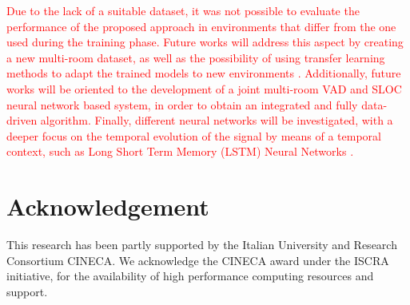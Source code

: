\documentclass[review]{elsarticle}
\begin{document}
\textcolor{red}{
Due to the lack of a suitable dataset, it was not possible to evaluate the performance of the proposed approach in environments that differ from the one used during the training phase. Future works will address this aspect by creating a new multi-room dataset, as well as the possibility of using transfer learning methods to adapt the trained models to new environments \cite{Pan2010}. Additionally, future works will be oriented to the development of a joint multi-room VAD \cite{ijcnn-vad,ijcnn2016-vad} and SLOC neural network based system, in order to obtain an integrated and fully data-driven algorithm. Finally, different neural networks will be investigated, with a deeper focus on the temporal evolution of the signal by means of a temporal context, such as Long Short Term Memory (LSTM) Neural Networks \cite{hochreiter1997long}.}

\section*{Acknowledgement}
This research has been partly supported by the Italian University and Research Consortium CINECA. We acknowledge the CINECA award under the ISCRA initiative, for the availability of high performance computing resources and support.







%




\end{document}
